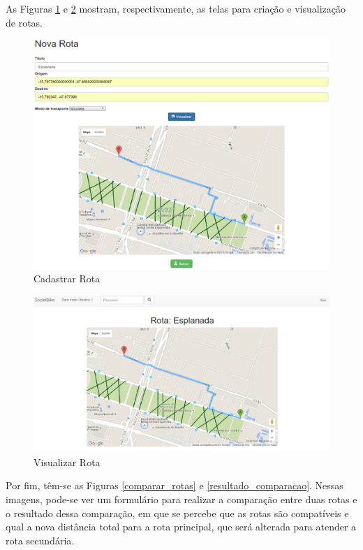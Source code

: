 As Figuras \ref{cadastrar_rota} e \ref{ver_rota} mostram, respectivamente, as telas para criação e visualização de rotas.

\begin{figure}[!h]
	\centering
	\includegraphics[scale=0.45]{figuras/resultados/cadastrar_rota.eps}
	\caption[Cadastrar Rota]{Cadastrar Rota}
	\label{cadastrar_rota}
\end{figure}

\newpage
\begin{figure}[!h]
	\centering
	\includegraphics[scale=0.45]{figuras/resultados/ver_rota.eps}
	\caption[Visualizar Rota]{Visualizar Rota}
	\label{ver_rota}
\end{figure}

Por fim, têm-se as Figuras \ref{comparar_rotas} e \ref{resultado_comparacao}. Nessas imagens, pode-se ver um formulário para realizar a comparação entre duas rotas e o resultado dessa comparação, em que se percebe que as rotas são compatíveis e qual a nova distância total para a rota principal, que será alterada para atender a rota secundária.

